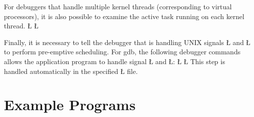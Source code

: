 \documentclass[openright,twoside]{report}
\begin{document}
For debuggers that handle multiple kernel threads (corresponding to \uC virtual processors), it is also possible to examine the active task running on each kernel thread.
\LGinlinefalse\LGbegin\lgrinde
\L{}
\L{}
\endlgrinde\LGend

Finally, it is necessary to tell the debugger that \uC is handling UNIX signals \LGinlinetrue\LGbegin\lgrinde\L{}\endlgrinde\LGend{} and \LGinlinetrue\LGbegin\lgrinde\L{}\endlgrinde\LGend{} to perform pre-emptive scheduling.
For gdb, the following debugger commands allows the application program to handle signal \LGinlinetrue\LGbegin\lgrinde\L{}\endlgrinde\LGend{} and \LGinlinetrue\LGbegin\lgrinde\L{}\endlgrinde\LGend{}:
\LGinlinefalse\LGbegin\lgrinde
\L{}
\L{}
\endlgrinde\LGend
This step is handled automatically in the specified \LGinlinetrue\LGbegin\lgrinde\L{}\endlgrinde\LGend{} file.


\chapter{Example Programs}
\label{c:ExamplePrograms}
\end{document}
